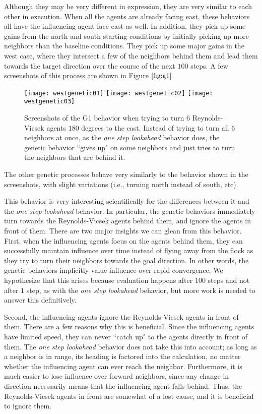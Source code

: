 Although they may be very different in expression, they are very similar to each
other in execution.
When all the agents are already facing east, these behaviors all have the
influencing agent face east as well.
In addition, they pick up some gains from the north and south starting conditions
by initially picking up more neighbors than the baseline conditions.
They pick up some major gains in the west case, where they intersect a few of
the neighbors behind them and lead them towards the target direction over the
course of the next $100$ steps.
A few screenshots of this process are shown in Figure $\ref{fig:g1}$.
\begin{figure}
    \centering
    \texttt{[image: westgenetic01]}
    \texttt{[image: westgenetic02]}
    \texttt{[image: westgenetic03]}
    \caption{Screenshots of the G1 behavior when trying to turn $6$
    Reynolds-Vicsek agents $180$ degrees to the east.
    Instead of trying to turn all $6$ neighbors at once, as the \textit{one step
    lookahead} behavior does, the genetic behavior ``gives up" on some neighbors
    and just tries to turn the neighbors that are behind it.}
    \label{fig:g1}
\end{figure}
The other genetic processes behave very similarly to the behavior shown in the
screenshots, with slight variations (i.e., turning north instead of south, etc).

This behavior is very interesting scientifically for the differences between it
and the \textit{one step lookahead} behavior.
In particular, the genetic behaviors immediately turn towards the Reynolds-Vicsek
agents behind them, and ignore the agents in front of them.
There are two major insights we can glean from this behavior.
First, when the influencing agents focus on the agents behind them, they can
successfully maintain influence over time instead of flying away from the flock
as they try to turn their neighbors towards the goal direction.
In other words, the genetic behaviors implicitly value influence over rapid
convergence.
We hypothesize that this arises because evaluation happens after $100$ steps and
not after $1$ step, as with the \textit{one step lookahead} behavior, but more
work is needed to answer this definitively.

Second, the influencing agents ignore the Reynolds-Vicsek agents in front of
them.
There are a few reasons why this is beneficial.
Since the influencing agents have limited speed, they can never ``catch
up" to the agents directly in front of them.
The \textit{one step lookahead} behavior does not take this into account;
as long as a neighbor is in range, its heading is factored into the calculation,
no matter whether the influencing agent can ever reach the neighbor.
Furthermore, it is much easier to lose influence over forward neighbors, since
any change in direction necessarily means that the influencing agent falls
behind.
Thus, the Reynolds-Vicsek agents in front are somewhat of a lost cause, and it
is beneficial to ignore them.

